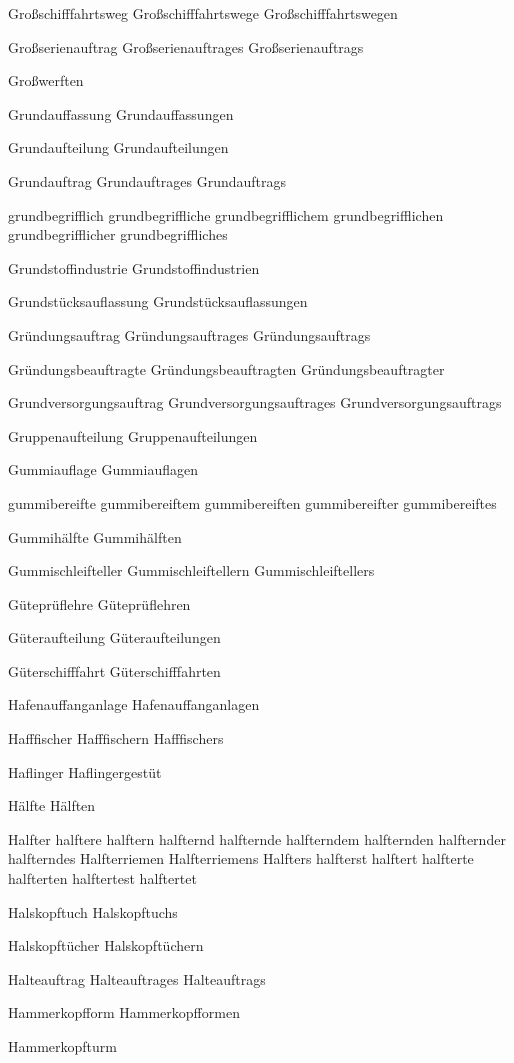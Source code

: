 Großschifffahrtsweg
Großschifffahrtswege
Großschifffahrtswegen

Großserienauftrag
Großserienauftrages
Großserienauftrags

Großwerften

Grundauffassung
Grundauffassungen

Grundaufteilung
Grundaufteilungen

Grundauftrag
Grundauftrages
Grundauftrags

grundbegrifflich
grundbegriffliche
grundbegrifflichem
grundbegrifflichen
grundbegrifflicher
grundbegriffliches

Grundstoffindustrie
Grundstoffindustrien

Grundstücksauflassung
Grundstücksauflassungen

Gründungsauftrag
Gründungsauftrages
Gründungsauftrags

Gründungsbeauftragte
Gründungsbeauftragten
Gründungsbeauftragter

Grundversorgungsauftrag
Grundversorgungsauftrages
Grundversorgungsauftrags

Gruppenaufteilung
Gruppenaufteilungen

Gummiauflage
Gummiauflagen

gummibereifte
gummibereiftem
gummibereiften
gummibereifter
gummibereiftes

Gummihälfte
Gummihälften

Gummischleifteller
Gummischleiftellern
Gummischleiftellers

Güteprüflehre
Güteprüflehren

Güteraufteilung
Güteraufteilungen

Güterschifffahrt
Güterschifffahrten

Hafenauffanganlage
Hafenauffanganlagen

Hafffischer
Hafffischern
Hafffischers

Haflinger
Haflingergestüt

Hälfte
Hälften

Halfter
halftere
halftern
halfternd
halfternde
halfterndem
halfternden
halfternder
halfterndes
Halfterriemen
Halfterriemens
Halfters
halfterst
halftert
halfterte
halfterten
halftertest
halftertet

Halskopftuch
Halskopftuchs

Halskopftücher
Halskopftüchern

Halteauftrag
Halteauftrages
Halteauftrags

Hammerkopfform
Hammerkopfformen

Hammerkopfturm

